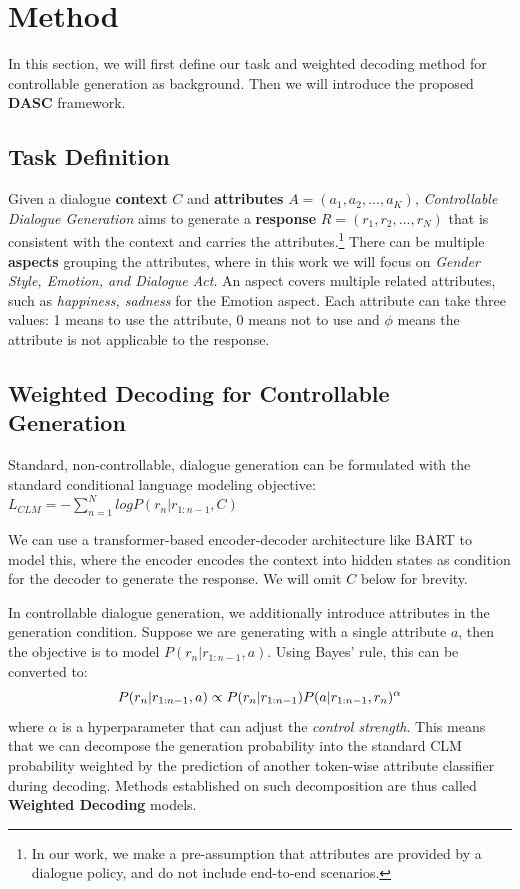 \section{Method}
\label{sec:method}
In this section, we will first define our task and weighted decoding method for controllable generation as background. Then we will introduce the proposed \textbf{DASC} framework. 
\subsection{Task Definition}

Given a dialogue \textbf{context} $C$ and \textbf{attributes} $A = (a_1, a_2, ..., a_K)$, \textit{Controllable Dialogue Generation} aims to generate a \textbf{response} $R = (r_1, r_2, ..., r_N)$ that is consistent with the context 
and carries the attributes.\footnote{In our work, we make a pre-assumption that attributes 
are provided by a dialogue policy, and do not include end-to-end scenarios.}
There can be multiple \textbf{aspects} grouping the attributes, where in this work we will focus on \textit{Gender Style, Emotion, and Dialogue Act}. An aspect covers multiple related attributes, such as \textit{happiness, sadness} for the Emotion aspect. Each attribute can take three values: 1 means to use the attribute, 0 means not to use and $\phi$ means the attribute is not
applicable to the response.

\subsection{Weighted Decoding for Controllable Generation}
\label{sec:weighted_decoding}

Standard, non-controllable, dialogue generation can be formulated with the standard conditional language modeling objective: $L_{CLM} = -\sum_{n=1}^N log P(r_n|r_{1:n-1}, C)$

We can use a transformer-based encoder-decoder architecture like BART \cite{lewis2020bart} to model this, where the encoder encodes the context into hidden states as condition for the decoder to generate the response. We will omit $C$ below for brevity.

In controllable dialogue generation, we additionally introduce attributes in the generation condition. Suppose we are generating with a single attribute $a$, then the objective is to model $P(r_n|r_{1:n-1}, a)$. Using Bayes' rule, this can be converted to:
\begin{equation}
    \small
    P(r_n|r_{1:n-1}, a) \propto P(r_n|r_{1:n-1}) P(a|r_{1:n-1}, r_n)^{\alpha}
    \label{eqn:single_wd}
\end{equation}
where $\alpha$ is a hyperparameter that can adjust the \textit{control strength}. This means that we can decompose the generation probability into the standard CLM probability weighted by the prediction of another token-wise attribute classifier during decoding. Methods established on such decomposition are thus called \textbf{Weighted Decoding} models.

